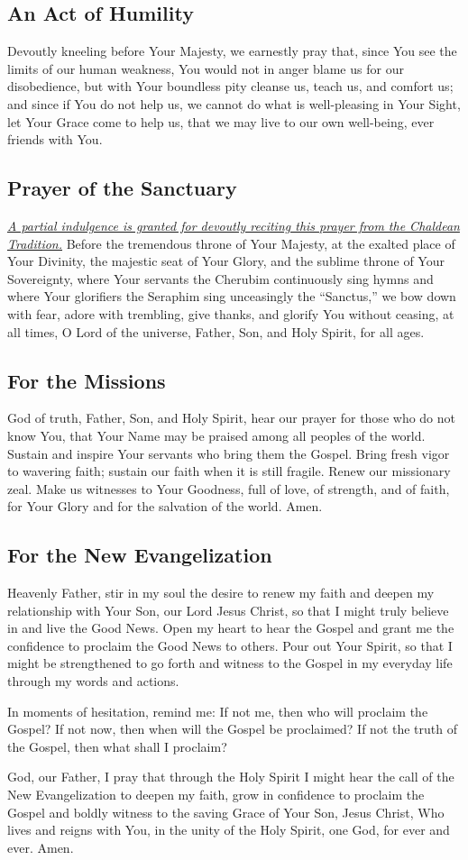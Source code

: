 \documentclass[12pt]{article}
\newcommand{\prayertitle}[1]{\subsection{#1}}
\newcommand{\indulgencedprayertitle}[1]{\prayertitle{#1 \protect\kreuz}}
\newcommand{\emphasis}[1]{\emph{#1}}
\newcommand{\emphasis}[1]{\textsl{#1}}
\newcommand{\note}[1]{{\small{\emphasis{#1}}}\newline}
\newcommand{\linkednote}[2]{\hyperlink{#1}{\note{#2}}}
\begin{document}
\prayertitle{An Act of Humility}
Devoutly kneeling before Your Majesty,
we earnestly pray that, since You see the limits of our human weakness, You would not in anger blame us for our disobedience, but with Your boundless pity cleanse us, teach us, and comfort us;
and since if You do not help us, we cannot do what is well-pleasing in Your Sight, let Your Grace come to help us, that we may live to our own well-being, ever friends with You.

\indulgencedprayertitle{Prayer of the Sanctuary}
\linkednote{grant23}{A partial indulgence is granted for devoutly reciting this prayer from the Chaldean Tradition.}
Before the tremendous throne of Your Majesty, at the exalted place of Your Divinity, the majestic seat of Your Glory, and the sublime throne of Your Sovereignty, where Your servants the Cherubim continuously sing hymns and where Your glorifiers the Seraphim sing unceasingly the ``Sanctus,'' we bow down with fear, adore with trembling, give thanks, and glorify You without ceasing, at all times, O Lord of the universe, Father, Son, and Holy Spirit, for all ages.

\prayertitle{For the Missions}
God of truth, Father, Son, and Holy Spirit, hear our prayer for those who do not know You, that Your Name may be praised among all peoples of the world.
Sustain and inspire Your servants who bring them the Gospel.
Bring fresh vigor to wavering faith; sustain our faith when it is still fragile.
Renew our missionary zeal.
Make us witnesses to Your Goodness, full of love, of strength, and of faith, for Your Glory and for the salvation of the world.
Amen.
\newpage
\prayertitle{For the New Evangelization}
\label{prayer:new_evangelization}
Heavenly Father, stir in my soul the desire to renew my faith and deepen my relationship with Your Son, our Lord Jesus Christ, so that I might truly believe in and live the Good News.   
Open my heart to hear the Gospel and grant me the confidence to proclaim the Good News to others.
Pour out Your Spirit, so that I might be strengthened to go forth and witness to the Gospel in my everyday life through my words and actions.  

In moments of hesitation, remind me:
If not me, then who will proclaim the Gospel?
If not now, then when will the Gospel be proclaimed?
If not the truth of the Gospel, then what shall I proclaim?

God, our Father, I pray that through the Holy Spirit I might hear the call of the New Evangelization to deepen my faith, grow in confidence to proclaim the Gospel and boldly witness to the saving Grace of Your Son, Jesus Christ, Who lives and reigns with You, in the unity of the Holy Spirit, one God, for ever and ever.
Amen.
\end{document}

